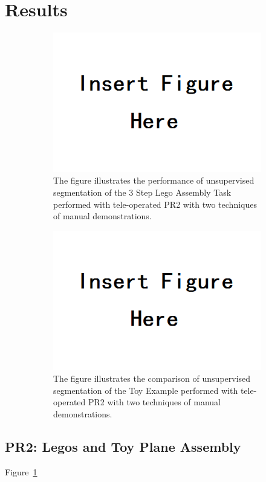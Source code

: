 \section{Results}

\begin{figure}[!ht]
	\centering
	\begin{subfigure}[t]{3.4in}
        \includegraphics[width=0.5\linewidth]{figures/insert}
		\caption{The figure illustrates the performance of unsupervised segmentation of the 3 Step Lego Assembly Task performed with tele-operated PR2 with two techniques of manual demonstrations.}
		\label{fig:lego-pr2}
		\vspace{-5pt}
	\end{subfigure}
	 \hspace{0.1in}
	\begin{subfigure}[t]{3.4in}
		\includegraphics[width=0.5\linewidth]{figures/insert}
		\caption{The figure illustrates the comparison of unsupervised segmentation of the Toy Example performed with tele-operated PR2 with two techniques of manual demonstrations.}
		\label{fig:toyPlane-pr2human}
		\vspace{-5pt}
	\end{subfigure}
	\caption{}
	\label{fig:pr2_expts}
	\vspace{-15pt}
\end{figure}

\subsection{PR2: Legos and Toy Plane Assembly}
Figure~\ref{fig:lego-pr2}


